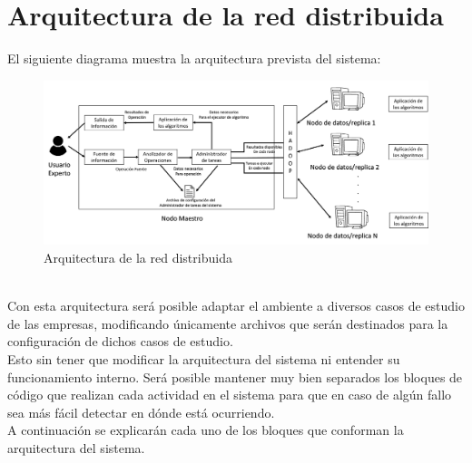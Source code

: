 \section{Arquitectura de la red distribuida}
El siguiente diagrama muestra la arquitectura prevista del sistema:
\begin{figure}[!htbp]
	\hypertarget{fig:cap1}{\hspace{1pt}}
	\begin{center}
		\includegraphics[height=0.3\textheight]{capitulo1/images/im1.png}
		\caption{Arquitectura de la red distribuida}
		\label{fig:cap1}
	\end{center}
\end{figure}
\\ 
Con esta arquitectura será posible adaptar el ambiente a diversos casos de estudio de las empresas, modificando únicamente archivos que serán destinados para la configuración de dichos
casos de estudio. 
\\
Esto sin tener que modificar la arquitectura del sistema ni entender su funcionamiento interno. Será posible
mantener muy bien separados los bloques de código que realizan cada actividad en el sistema para que en caso de algún fallo sea
más fácil detectar en dónde está ocurriendo.
\\
A continuación se explicarán cada uno de los bloques que conforman la arquitectura del sistema.

